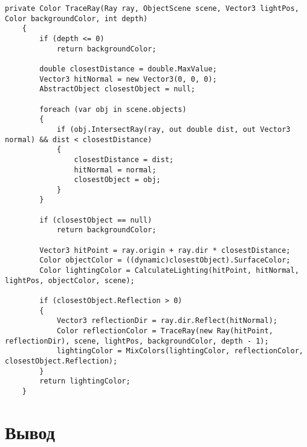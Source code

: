 \clearpage
\begin{center}
	\begin{lstlisting}[label={lst:RayTracing}, captionpos={b}, caption={Алгоритм трассировки лучей}]
	private Color TraceRay(Ray ray, ObjectScene scene, Vector3 lightPos, Color backgroundColor, int depth)
	{
		if (depth <= 0)
			return backgroundColor;
		
		double closestDistance = double.MaxValue;
		Vector3 hitNormal = new Vector3(0, 0, 0);
		AbstractObject closestObject = null;
		
		foreach (var obj in scene.objects)
		{
			if (obj.IntersectRay(ray, out double dist, out Vector3 normal) && dist < closestDistance)
			{
				closestDistance = dist;
				hitNormal = normal;
				closestObject = obj;
			}
		}
		
		if (closestObject == null)
			return backgroundColor;
		
		Vector3 hitPoint = ray.origin + ray.dir * closestDistance;
		Color objectColor = ((dynamic)closestObject).SurfaceColor;
		Color lightingColor = CalculateLighting(hitPoint, hitNormal, lightPos, objectColor, scene);
		
		if (closestObject.Reflection > 0)
		{
			Vector3 reflectionDir = ray.dir.Reflect(hitNormal);
			Color reflectionColor = TraceRay(new Ray(hitPoint, reflectionDir), scene, lightPos, backgroundColor, depth - 1);
			lightingColor = MixColors(lightingColor, reflectionColor, closestObject.Reflection);
		}
		return lightingColor;
	}
	\end{lstlisting}
\end{center}

\section{Вывод}


\clearpage
